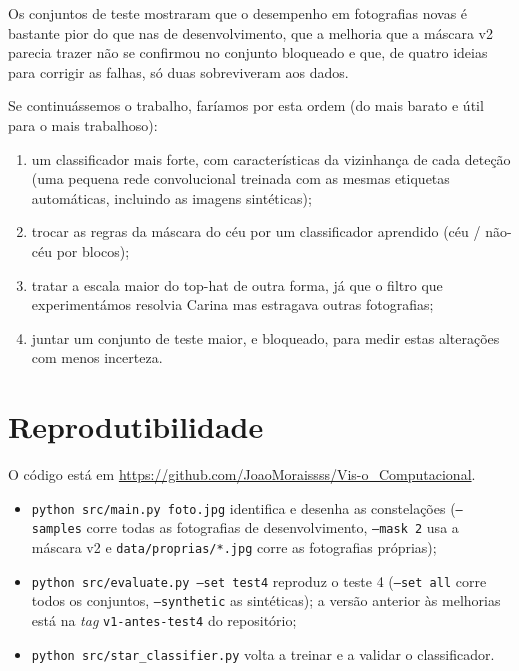 \documentclass[11pt,a4paper]{article}
\begin{document}
Os conjuntos de teste mostraram que o desempenho em fotografias novas é
bastante pior do que nas de desenvolvimento, que a melhoria que a máscara v2
parecia trazer não se confirmou no conjunto bloqueado e que, de quatro ideias
para corrigir as falhas, só duas sobreviveram aos dados.

Se continuássemos o trabalho, faríamos por esta ordem (do mais barato e útil
para o mais trabalhoso):
\begin{enumerate}
  \item um classificador mais forte, com características da vizinhança de
        cada deteção (uma pequena rede convolucional treinada com as mesmas
        etiquetas automáticas, incluindo as imagens sintéticas);
  \item trocar as regras da máscara do céu por um classificador aprendido
        (céu / não-céu por blocos);
  \item tratar a escala maior do top-hat de outra forma, já que o filtro que
        experimentámos resolvia Carina mas estragava outras fotografias;
  \item juntar um conjunto de teste maior, e bloqueado, para medir estas
        alterações com menos incerteza.
\end{enumerate}

\section*{Reprodutibilidade}
O código está em \url{https://github.com/JoaoMoraissss/Vis-o_Computacional}.
\begin{itemize}
  \item \texttt{python src/main.py foto.jpg} identifica e desenha as
        constelações (\texttt{--samples} corre todas as fotografias de
        desenvolvimento, \texttt{--mask 2} usa a máscara v2 e
        \texttt{data/proprias/*.jpg} corre as fotografias próprias);
  \item \texttt{python src/evaluate.py --set test4} reproduz o teste 4
        (\texttt{--set all} corre todos os conjuntos, \texttt{--synthetic}
        as sintéticas); a versão anterior às melhorias está na
        \emph{tag} \texttt{v1-antes-test4} do repositório;
  \item \texttt{python src/star\_classifier.py} volta a treinar e a validar
        o classificador.
\end{itemize}

\end{document}
